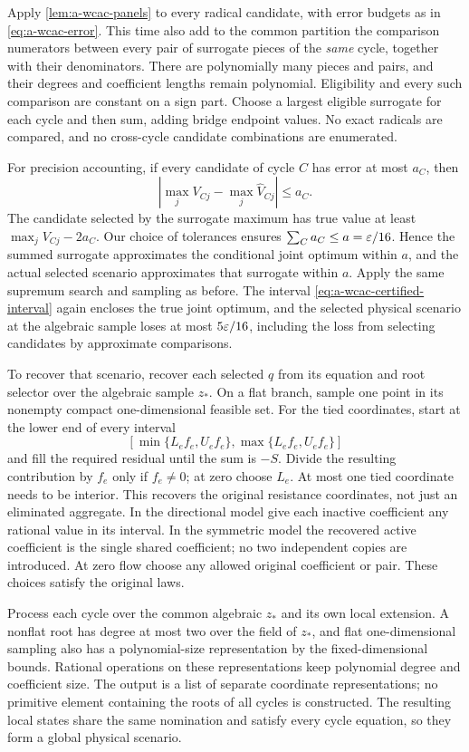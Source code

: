 Apply \cref{lem:a-wcac-panels} to every radical candidate, with error
budgets as in \eqref{eq:a-wcac-error}. This time also add to the common
partition the comparison numerators between every pair of surrogate
pieces of the \emph{same} cycle, together with their denominators.
There are polynomially many pieces and pairs, and their degrees and
coefficient lengths remain polynomial. Eligibility and every such
comparison are constant on a sign part. Choose a largest eligible
surrogate for each cycle and then sum, adding bridge endpoint values.
No exact radicals are compared, and no cross-cycle candidate combinations
are enumerated.

For precision accounting, if every candidate of cycle $C$ has error at
most $a_C$, then
\[
 \left|\max_j V_{Cj}-\max_j\widehat V_{Cj}\right|\le a_C.
\]
The candidate selected by the surrogate maximum has true value at least
$\max_j V_{Cj}-2a_C$. Our choice of tolerances ensures
$\sum_C a_C\le a=\varepsilon/16$. Hence the summed surrogate approximates the
conditional joint optimum within $a$, and the actual selected scenario
approximates that surrogate within $a$. Apply the same supremum search
and sampling as before. The interval \eqref{eq:a-wcac-certified-interval}
again encloses the true joint optimum, and the selected physical scenario
at the algebraic sample loses at most $5\varepsilon/16$, including the loss from
selecting candidates by approximate comparisons.

To recover that scenario, recover each selected $q$ from its equation and
root selector over the algebraic sample $z_*$. On a flat branch, sample
one point in its nonempty compact one-dimensional feasible set. For the
tied coordinates, start at the lower end of every interval
\[
 [\min\{L_ef_e,U_ef_e\},\max\{L_ef_e,U_ef_e\}]
\]
and fill the required residual until the sum is $-S$. Divide the resulting
contribution by $f_e$ only if $f_e\ne0$; at zero choose $L_e$. At most one
tied coordinate needs to be interior. This recovers the original
resistance coordinates, not just an eliminated aggregate. In the
directional model give each inactive coefficient any rational value in
its interval. In the symmetric model the recovered active coefficient is
the single shared coefficient; no two independent copies are introduced.
At zero flow choose any allowed original coefficient or pair. These
choices satisfy the original laws.

Process each cycle over the common algebraic $z_*$ and its own local
extension. A nonflat root has degree at most two over the field of $z_*$,
and flat one-dimensional sampling also has a polynomial-size
representation by the fixed-dimensional bounds. Rational operations on
these representations keep polynomial degree and coefficient size. The
output is a list of separate coordinate representations; no primitive
element containing the roots of all cycles is constructed. The resulting
local states share the same nomination and satisfy every cycle equation,
so they form a global physical scenario.

